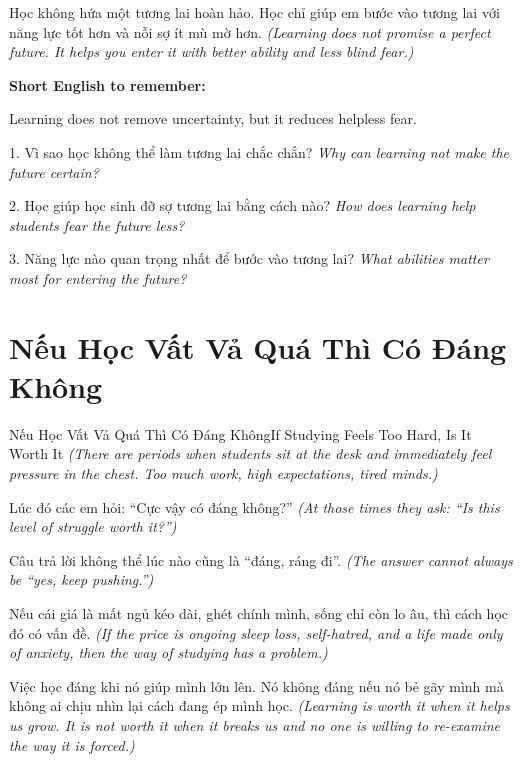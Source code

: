 \begin{baihoc}
Học không hứa một tương lai hoàn hảo. Học chỉ giúp em bước vào tương lai với năng lực tốt hơn và nỗi sợ ít mù mờ hơn.
\textit{(Learning does not promise a perfect future. It helps you enter it with better ability and less blind fear.)}
\end{baihoc}

\begin{ghinhoanh}
\textbf{Short English to remember:}

Learning does not remove uncertainty, but it reduces helpless fear.

\end{ghinhoanh}

\begin{tuhocnhanh}
1. Vì sao học không thể làm tương lai chắc chắn? \textit{Why can learning not make the future certain?}

2. Học giúp học sinh đỡ sợ tương lai bằng cách nào? \textit{How does learning help students fear the future less?}

3. Năng lực nào quan trọng nhất để bước vào tương lai? \textit{What abilities matter most for entering the future?}
\end{tuhocnhanh}
\ngancach

\section{Nếu Học Vất Vả Quá Thì Có Đáng Không}
\begin{truyen}{Nếu Học Vất Vả Quá Thì Có Đáng Không}{If Studying Feels Too Hard, Is It Worth It}
\textit{(There are periods when students sit at the desk and immediately feel pressure in the chest. Too much work, high expectations, tired minds.)}

Lúc đó các em hỏi: “Cực vậy có đáng không?”
\textit{(At those times they ask: “Is this level of struggle worth it?”)}

Câu trả lời không thể lúc nào cũng là “đáng, ráng đi”.
\textit{(The answer cannot always be “yes, keep pushing.”)}

Nếu cái giá là mất ngủ kéo dài, ghét chính mình, sống chỉ còn lo âu, thì cách học đó có vấn đề.
\textit{(If the price is ongoing sleep loss, self-hatred, and a life made only of anxiety, then the way of studying has a problem.)}

Việc học đáng khi nó giúp mình lớn lên. Nó không đáng nếu nó bẻ gãy mình mà không ai chịu nhìn lại cách đang ép mình học.
\textit{(Learning is worth it when it helps us grow. It is not worth it when it breaks us and no one is willing to re-examine the way it is forced.)}
\end{truyen}

